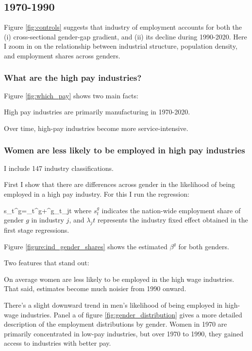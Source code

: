 

\subsection{1970-1990}

Figure \ref{fig:controls} suggests that industry of employment accounts for both the (i) cross-sectional gender-gap gradient, and (ii) its decline during 1990-2020. Here I zoom in on the relationship between industrial structure, population density, and employment shares across genders.

\subsubsection{What are the high pay industries?}

Figure \ref{fig:which_pay} shows two main facts:
\bitem
	\item High pay industries are primarily manufacturing in 1970-2020.
	\item Over time, high-pay industries become more service-intensive.	
\eitem 



\subsubsection{Women are less likely to be employed in high pay industries}

I include 147 industry classifications. 

First I show that there are differences across gender in the likelihood of being employed in a high pay industry. For this I run the regression:

\beqns
	s_{t}^g=\alpha_t^g+\beta^g_t\lambda_{jt}
\eeqns
where $s_{t}^g$ indicates the nation-wide employment share of gender $g$ in industry $j$, and $\lambda_jt$ represents the industry fixed effect obtained in the first stage regressions.





Figure \ref{figure:ind_gender_shares} shows the estimated $\beta^g$ for both genders.

Two features that stand out:
\bitem
	\item On average women are less likely to be employed in the high wage industries. That said, estimates become much noisier from 1990 onward.
	\item There's a slight downward trend in men's likelihood of being employed in high-wage industries.
\eitem
Panel a of figure \ref{fig:gender_distribution} gives a more detailed description of the employment distributions by gender. Women in 1970 are primarily concentrated in low-pay industries, but over 1970 to 1990, they gained access to industries with better pay. 


